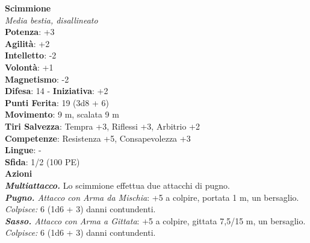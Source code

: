 \begin{multicols}{2}
\medskip\textbf{Scimmione}\\
\emph{Media bestia, disallineato}\\
\textbf{Potenza}: +3\\
\textbf{Agilità}: +2\\
\textbf{Intelletto}: -2\\
\textbf{Volontà}: +1\\
\textbf{Magnetismo}: -2\\
\textbf{Difesa}: 14 - \textbf{Iniziativa}: +2\\
\textbf{Punti Ferita}: 19 (3d8 + 6)\\
\textbf{Movimento}: 9 m, scalata 9 m\\
\textbf{Tiri Salvezza}: Tempra +3, Riflessi +3, Arbitrio +2\\
\textbf{Competenze}: Resistenza +5, Consapevolezza +3\\
\textbf{Lingue}: -\\
\textbf{Sfida}: 1/2 (100 PE)\smallskip\\
\smallskip\textbf{Azioni}\\
\emph{\textbf{Multiattacco.}} Lo scimmione effettua due attacchi di pugno.\\
\emph{\textbf{Pugno.} Attacco con Arma da Mischia}: +5 a colpire, portata 1 m, un bersaglio.\\
\emph{Colpisce:} 6 (1d6 + 3) danni contundenti.\\
\emph{\textbf{Sasso.} Attacco con Arma a Gittata}: +5 a colpire, gittata 7,5/15 m, un bersaglio.\\
\emph{Colpisce:} 6 (1d6 + 3) danni contundenti.\\


\end{multicols}
